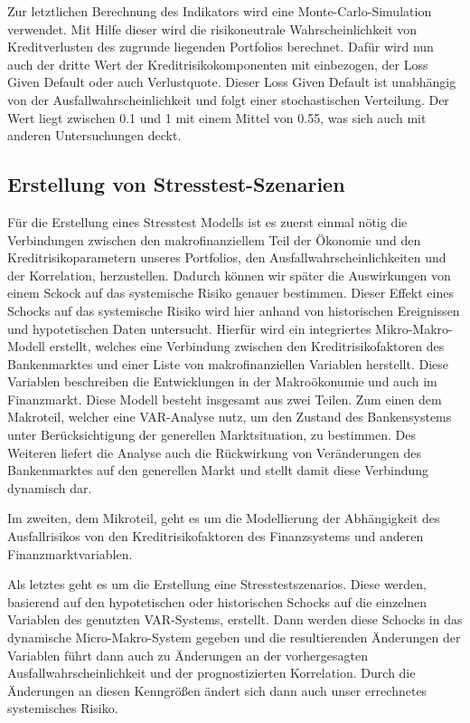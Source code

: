 \documentclass[a4paper,12pt]{scrartcl}
\begin{document}
Zur letztlichen Berechnung des Indikators wird eine Monte-Carlo-Simulation verwendet. Mit Hilfe dieser wird die risikoneutrale Wahrscheinlichkeit von Kreditverlusten des zugrunde liegenden Portfolios berechnet. Dafür wird nun auch der dritte Wert der Kreditrisikokomponenten mit einbezogen, der Loss Given Default oder auch Verlustquote. Dieser Loss Given Default ist unabhängig von der Ausfallwahrscheinlichkeit und folgt einer stochastischen Verteilung. Der Wert liegt zwischen 0.1 und 1 mit einem Mittel von 0.55, was sich auch mit anderen Untersuchungen deckt.

\subsection{Erstellung von Stresstest-Szenarien}
Für die Erstellung eines Stresstest Modells ist es zuerst einmal nötig die Verbindungen zwischen den makrofinanziellem Teil der Ökonomie und den Kreditrisikoparametern unseres Portfolios, den Ausfallwahrscheinlichkeiten und der Korrelation, herzustellen. Dadurch können wir später die Auswirkungen von einem Sckock auf das systemische Risiko genauer bestimmen. 
Dieser Effekt eines Schocks auf das systemische Risiko wird hier anhand von historischen Ereignissen und hypotetischen Daten untersucht. Hierfür wird ein integriertes Mikro-Makro-Modell erstellt, welches eine Verbindung zwischen den Kreditrisikofaktoren des Bankenmarktes und einer Liste von makrofinanziellen Variablen herstellt. Diese Variablen beschreiben die Entwicklungen in der Makroökonumie und auch im Finanzmarkt.
Diese Modell besteht insgesamt aus zwei Teilen. Zum einen dem Makroteil, welcher eine VAR-Analyse nutz, um den Zustand des Bankensystems unter Berücksichtigung der generellen Marktsituation, zu bestimmen. Des Weiteren liefert die Analyse auch die Rückwirkung von Veränderungen des Bankenmarktes auf den generellen Markt und stellt damit diese Verbindung dynamisch dar.

Im zweiten, dem Mikroteil, geht es um die Modellierung der Abhängigkeit des Ausfallrisikos von den Kreditrisikofaktoren des Finanzsystems und anderen Finanzmarktvariablen.



Als letztes geht es um die Erstellung eine Stresstestszenarios. Diese werden, basierend auf den hypotetischen oder historischen Schocks auf die einzelnen Variablen des genutzten VAR-Systems, erstellt. 
Dann werden diese Schocks in das dynamische Micro-Makro-System gegeben und die resultierenden Änderungen der Variablen führt dann auch zu Änderungen an der vorhergesagten Ausfallwahrscheinlichkeit und der prognostizierten Korrelation. Durch die Änderungen an diesen Kenngrößen ändert sich dann auch unser errechnetes systemisches Risiko. 
\end{document}
